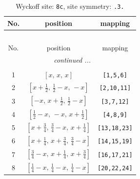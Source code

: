 \documentclass[fleqn,8pt]{jsarticle}
\begin{document}
\renewcommand{\arraystretch}{1.2}
\begin{longtable}{ccc}
\caption{Wyckoff site: {\tt 8c}, site symmetry: {\tt .3.}}
 \\
 \hline \hline
No. & position & mapping \\ \hline \endfirsthead

\multicolumn{2}{l}{\tablename\ \thetable{}} \\
 \hline \hline
No. & position & mapping \\ \hline \endhead

 \hline \hline
\multicolumn{2}{r}{\footnotesize\it continued ...} \\ \endfoot

 \hline \hline
\multicolumn{2}{r}{} \\ \endlastfoot

1 & $\left[ x,\, x,\, x \right]$ & {\tt [1,5,6]} \\ \hline
2 & $\left[ x + \frac{1}{2},\, \frac{1}{2} - x,\, - x \right]$ & {\tt [2,10,11]} \\ \hline
3 & $\left[ - x,\, x + \frac{1}{2},\, \frac{1}{2} - x \right]$ & {\tt [3,7,12]} \\ \hline
4 & $\left[ \frac{1}{2} - x,\, - x,\, x + \frac{1}{2} \right]$ & {\tt [4,8,9]} \\ \hline
5 & $\left[ x + \frac{3}{4},\, \frac{3}{4} - x,\, x + \frac{1}{4} \right]$ & {\tt [13,18,23]} \\ \hline
6 & $\left[ x + \frac{1}{4},\, x + \frac{3}{4},\, \frac{3}{4} - x \right]$ & {\tt [14,15,19]} \\ \hline
7 & $\left[ \frac{3}{4} - x,\, x + \frac{1}{4},\, x + \frac{3}{4} \right]$ & {\tt [16,17,21]} \\ \hline
8 & $\left[ \frac{1}{4} - x,\, \frac{1}{4} - x,\, \frac{1}{4} - x \right]$ & {\tt [20,22,24]} \\
\end{longtable}
\renewcommand{\arraystretch}{1.2}
\end{document}
